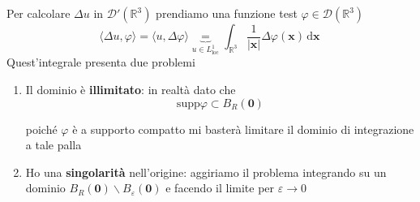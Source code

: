 \documentclass[10pt,a4paper,twoside,openright]{book}
\newcommand{\x}{\mathbf{x}}
\newcommand{\zer}{\mathbf{0}}
\newcommand{\de}{\,\mathrm d}
\newcommand{\dxx}{\de \x}
\begin{document}
Per calcolare $\displaystyle \Delta u$ in $\displaystyle \mathcal{D} '\left(\mathbb{R}^{3}\right)$ prendiamo una funzione test $\displaystyle \varphi \in \mathcal{D}\left(\mathbb{R}^{3}\right)$
\begin{equation*}
	\langle \Delta u,\varphi \rangle =\langle u,\Delta \varphi \rangle \underbrace{=}_{u\in L^{1}_{\text{loc}}}\int _{\mathbb{R}^{3}}\frac{1}{| \x| } \Delta \varphi (\x) \dxx \ 
\end{equation*}
Quest'integrale presenta due problemi
\begin{enumerate}
	\item Il dominio è \textbf{illimitato}: in realtà dato che
	      \begin{equation*}
	      	\text{supp} \varphi \subset B_{R}(\zer)
	      \end{equation*}
	      	      
	      poiché $\displaystyle \varphi $ è a supporto compatto mi basterà limitare il dominio di integrazione a tale palla
	\item Ho una \textbf{singolarità} nell'origine: aggiriamo il problema integrando su un dominio $\displaystyle B_{R}(\zer) \backslash B_{\varepsilon }(\zer)$ e facendo il limite per $\displaystyle \varepsilon \rightarrow 0$
	      
	      \begin{figure}[htpb]
	      	\centering
	      	
	      	\begin{tikzpicture}[x=0.75pt,y=0.75pt,yscale=-1,xscale=1]
	      		

\end{tikzpicture}
\end{figure}
\end{enumerate}
\end{document}
